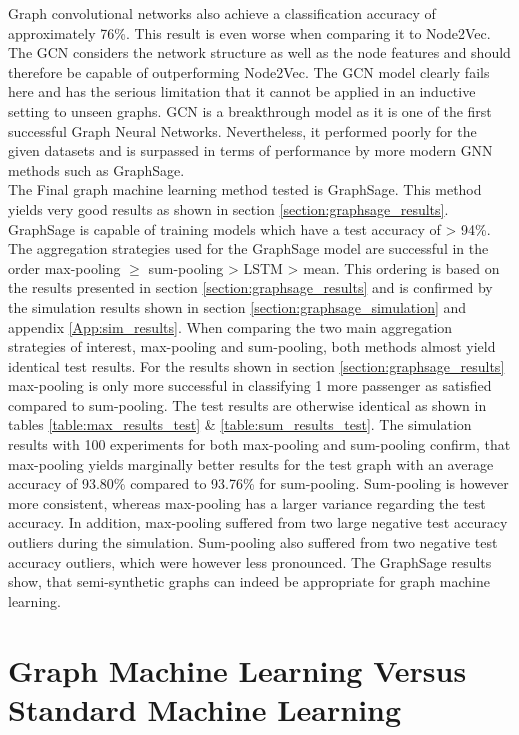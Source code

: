   \noindent Graph convolutional networks also achieve a classification 
  accuracy of approximately 76\%. This result is even worse when comparing it
  to Node2Vec. The GCN considers the network structure as well as the node 
  features and should therefore be capable of outperforming Node2Vec. The GCN 
  model clearly fails here and has the serious limitation that it cannot be 
  applied in an inductive setting to unseen graphs. GCN is a breakthrough model 
  as it is one of the first successful Graph Neural Networks. Nevertheless, it 
  performed poorly for the given datasets and is surpassed in terms of 
  performance by more modern GNN methods such as GraphSage. \\

  \noindent The Final graph machine learning method tested is GraphSage. This
  method yields very good results as shown in section 
  \ref{section:graphsage_results}. GraphSage is capable of training models
  which have a test accuracy of > 94\%. The aggregation strategies used for the
  GraphSage model are successful in the order max-pooling $\geqslant$ 
  sum-pooling > LSTM > mean. This ordering is based on the results presented in 
  section \ref{section:graphsage_results} and is confirmed by the simulation 
  results shown in section \ref{section:graphsage_simulation} and appendix
  \ref{App:sim_results}. 
  When comparing the two main aggregation strategies of interest, max-pooling 
  and sum-pooling, both methods almost yield identical test results. For the
  results shown in section \ref{section:graphsage_results} max-pooling is only 
  more successful in classifying 1 more passenger as satisfied compared to
  sum-pooling. The test results are otherwise identical as shown in tables 
  \ref{table:max_results_test} \& \ref{table:sum_results_test}. The simulation
  results with 100 experiments for both max-pooling and sum-pooling confirm,
  that max-pooling yields marginally better results for the test graph with an
  average accuracy of 93.80\% compared to 93.76\% for sum-pooling. Sum-pooling
  is however more consistent, whereas max-pooling has a larger variance 
  regarding the test accuracy. In addition, max-pooling suffered from two large 
  negative test accuracy outliers during the simulation. Sum-pooling also 
  suffered from two negative test accuracy outliers, which were however less 
  pronounced. The GraphSage results show, that semi-synthetic graphs can indeed 
  be appropriate for graph machine learning.

  \section{Graph Machine Learning Versus Standard Machine Learning}


